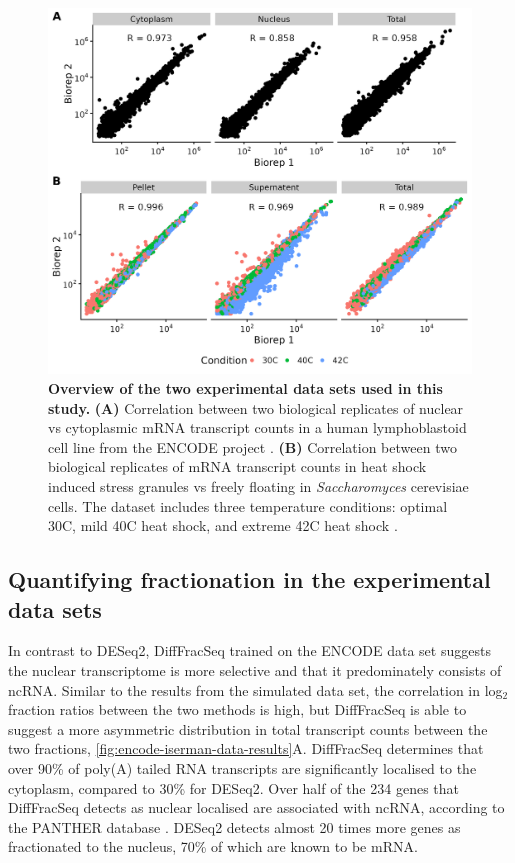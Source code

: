 \documentclass[../main.tex]{subfiles}
\begin{document}
\begin{figure}

{\centering \includegraphics[width=0.95\linewidth]{figures/fractionation_experimental_dataset_summary.png} 

}

\caption[Summary experimental test data sets.]{\textbf{Overview of the two experimental data sets used in this study.} \textbf{(A)} Correlation between two biological replicates of nuclear vs cytoplasmic mRNA transcript counts in a human lymphoblastoid cell line from the ENCODE project \parencite{Dunham2012}. \textbf{(B)} Correlation between two biological replicates of mRNA transcript counts in heat shock induced stress granules vs freely floating in \textit{Saccharomyces} cerevisiae cells. The dataset includes three temperature conditions: optimal 30C, mild 40C heat shock, and extreme 42C heat shock  \parencite{Iserman2020}.} \label{fig:fractionation-datasets}
\end{figure}

\subsection{Quantifying fractionation in the experimental data sets}

In contrast to DESeq2, DiffFracSeq trained on the ENCODE data set suggests the nuclear transcriptome is more selective and that it predominately consists of ncRNA.
Similar to the results from the simulated data set, the correlation in log$_2$ fraction ratios between the two methods is high, but DiffFracSeq is able to suggest a more asymmetric distribution in total transcript counts between the two fractions, \ref{fig:encode-iserman-data-results}A.
DiffFracSeq determines that over 90\% of poly(A) tailed RNA transcripts are significantly localised to the cytoplasm, compared to 30\% for DESeq2.
Over half of the 234 genes that DiffFracSeq detects as nuclear localised are associated with ncRNA, according to the PANTHER database \parencite{Mi2013}. 
DESeq2 detects almost 20 times more genes as fractionated to the nucleus, 70\% of which are known to be mRNA.
\end{document}
